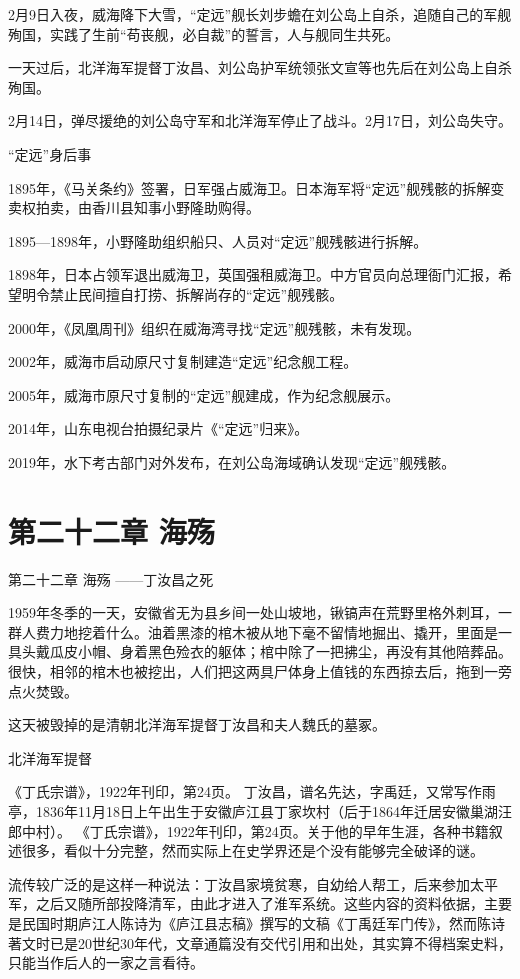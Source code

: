 \documentclass[12pt,UTF8]{ctexbook}
\begin{document}
2月9日入夜，威海降下大雪，“定远”舰长刘步蟾在刘公岛上自杀，追随自己的军舰殉国，实践了生前“苟丧舰，必自裁”的誓言，人与舰同生共死。

一天过后，北洋海军提督丁汝昌、刘公岛护军统领张文宣等也先后在刘公岛上自杀殉国。

2月14日，弹尽援绝的刘公岛守军和北洋海军停止了战斗。2月17日，刘公岛失守。

“定远”身后事

1895年，《马关条约》签署，日军强占威海卫。日本海军将“定远”舰残骸的拆解变卖权拍卖，由香川县知事小野隆助购得。

1895—1898年，小野隆助组织船只、人员对“定远”舰残骸进行拆解。

1898年，日本占领军退出威海卫，英国强租威海卫。中方官员向总理衙门汇报，希望明令禁止民间擅自打捞、拆解尚存的“定远”舰残骸。

2000年，《凤凰周刊》组织在威海湾寻找“定远”舰残骸，未有发现。

2002年，威海市启动原尺寸复制建造“定远”纪念舰工程。

2005年，威海市原尺寸复制的“定远”舰建成，作为纪念舰展示。

2014年，山东电视台拍摄纪录片《“定远”归来》。

2019年，水下考古部门对外发布，在刘公岛海域确认发现“定远”舰残骸。

\chapter{第二十二章 海殇}

第二十二章
海殇
——丁汝昌之死

1959年冬季的一天，安徽省无为县乡间一处山坡地，锹镐声在荒野里格外刺耳，一群人费力地挖着什么。油着黑漆的棺木被从地下毫不留情地掘出、撬开，里面是一具头戴瓜皮小帽、身着黑色殓衣的躯体；棺中除了一把拂尘，再没有其他陪葬品。很快，相邻的棺木也被挖出，人们把这两具尸体身上值钱的东西掠去后，拖到一旁点火焚毁。

这天被毁掉的是清朝北洋海军提督丁汝昌和夫人魏氏的墓冢。

北洋海军提督

《丁氏宗谱》，1922年刊印，第24页。
丁汝昌，谱名先达，字禹廷，又常写作雨亭，1836年11月18日上午出生于安徽庐江县丁家坎村（后于1864年迁居安徽巢湖汪郎中村）。 《丁氏宗谱》，1922年刊印，第24页。关于他的早年生涯，各种书籍叙述很多，看似十分完整，然而实际上在史学界还是个没有能够完全破译的谜。

流传较广泛的是这样一种说法：丁汝昌家境贫寒，自幼给人帮工，后来参加太平军，之后又随所部投降清军，由此才进入了淮军系统。这些内容的资料依据，主要是民国时期庐江人陈诗为《庐江县志稿》撰写的文稿《丁禹廷军门传》，然而陈诗著文时已是20世纪30年代，文章通篇没有交代引用和出处，其实算不得档案史料，只能当作后人的一家之言看待。
\end{document}
